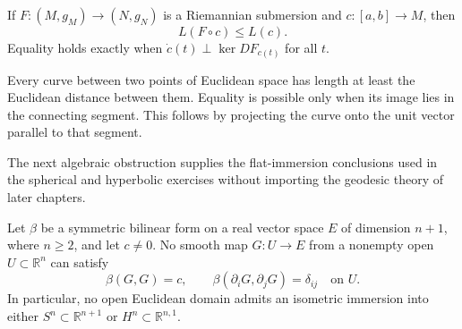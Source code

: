 \begin{remark}
  \label{rem:pet-ch1-ex-18}


  If $F:(M,g_M)\to(N,g_N)$ is a Riemannian submersion and
  $c:[a,b]\to M$, then
  \[
    L(F\circ c)\le L(c).
  \]
  Equality holds exactly when
  $\dot c(t)\perp\ker DF_{c(t)}$ for all $t$.
\end{remark}

\begin{remark}
  \label{rem:pet-ch1-ex-19}


  Every curve between two points of Euclidean space has length at least the
  Euclidean distance between them. Equality is possible only when its image
  lies in the connecting segment. This follows by projecting the curve onto
  the unit vector parallel to that segment.
\end{remark}

The next algebraic obstruction supplies the flat-immersion conclusions used in
the spherical and hyperbolic exercises without importing the geodesic theory of
later chapters.

\begin{proposition}
  \label{prop:pet-ch1-no-flat-immersion}


  Let $\beta$ be a symmetric bilinear form on a real vector space $E$ of
  dimension $n+1$, where $n\ge2$, and let $c\ne0$. No smooth map
  $G:U\to E$ from a nonempty open $U\subset\mathbb{R}^n$ can satisfy
  \[
    \beta(G,G)=c,
    \qquad
    \beta(\partial_iG,\partial_jG)=\delta_{ij}
    \quad\text{on }U.
  \]
  In particular, no open Euclidean domain admits an isometric immersion into
  either $S^n\subset\mathbb{R}^{n+1}$ or
  $H^n\subset\mathbb{R}^{n,1}$.
\end{proposition}


